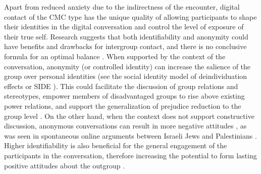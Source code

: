\documentclass[dissertation,math,vertlayout,pdfa,colorlinks]{aaltoseries}
\begin{document}
Apart from reduced anxiety due to the indirectness of the encounter, digital contact of the CMC type has the unique quality of allowing participants to shape their identities in the digital conversation and control the level of exposure of their true self. Research suggests that both identifiability and anonymity could have benefits and drawbacks for intergroup contact, and there is no conclusive formula for an optimal balance \cite{haslerOnlineIntergroupContact2013, imperatoAllportMeetsInternet2021, whiteTextbasedEcontactHarnessing2020}. When supported by the context of the conversation, anonymity (or controlled identity) can increase the salience of the group over personal identities (see the social identity model of deindividuation effects or SIDE \cite{reicherSocialIdentityModel1995}). This could facilitate the discussion of group relations and stereotypes, empower members of disadvantaged groups to rise above existing power relations, and support the generalization of prejudice reduction to the group level \cite{kleinSocialIdentityPerformance2016,spearsWhenAreNet2002}. On the other hand, when the context does not support constructive discussion, anonymous conversations can result in more negative attitudes \cite{whiteImprovingIntergroupRelations2015}, as was seen in spontaneous online arguments between Israeli Jews and Palestinians \cite{ellisOnlineArgumentIsraeli2007}. Higher identifiability is also beneficial for the general engagement of the participants in the conversation, therefore increasing the potential to form lasting positive attitudes about the outgroup \cite{schumannWhenComputermediatedIntergroup2017}.
\end{document}
